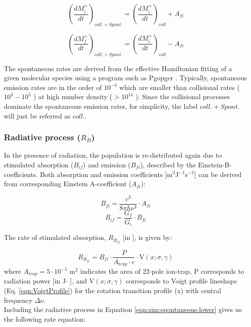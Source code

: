 \begin{equation}
    \left( \frac{dM^+_i}{dt} \right) _{coll. + Spont.} = \left( \frac{dM^+_i}{dt} \right) _{coll} + A_{fi}
    \label{eqn:sim:spontaneous-lower}
\end{equation}

\begin{equation}
    \left( \frac{dM^+_f}{dt} \right) _{coll. + Spont.} = \left( \frac{dM^+_i}{dt} \right) _{coll} - A_{fi}
    \label{eqn:sim:spontaneous-upper}
\end{equation}

The spontaneous rates are derived from the effective Hamiltonian fitting of a given molecular species using a program such as Pgopger \cite{western_pgopher_2017}. Typically, spontaneous emission rates are in the order of  $10^{-4}$ \pers which are smaller than collisional rates ($10^{3}-10^{5}$ \pers) at high number density ($>10^{14}$ \percc). Since the collisional processes dominate the spontaneous emission rates, for simplicity, the label $coll. + Spont.$ will just be referred as $coll.$.\\

\subsubsection{Radiative process (\texorpdfstring{$R_B$}{R_B})}
\label{subsec:ROSAA-simulation-rad}

In the presence of radiation, the population is re-distributed again due to stimulated absorption ($B_{if}$) and emission ($B_{fi}$), described by the Einstein-B-coefficients. Both absorption and emission coefficients [m$^3$J$^{-1}$s$^{-2}$] can be derived from corresponding Einstein A-coefficient ($A_{fi}$):

\[ B_{fi} = \frac{c^3}{8\pi h \nu ^3} \cdot A_{fi} \]
\[ B_{if} = \frac{G_f}{G_i} \cdot B_{fi} \]

The rate of stimulated absorption, $R_{B_{if}}$ [in \pers], is given by:

\[ R_{B_{fi}} = B_{fi} \cdot \frac{P}{A_{trap} \cdot c} \cdot \text{V}(x;\sigma, \gamma) \]
where $A_{trap}=5 \cdot 10^{-5}$ m$^2$ indicates the area of 22-pole ion-trap, P corresponds to radiation power [in J$\cdot$ \pers], and $\text{V}(x;\sigma, \gamma)$ corresponds to Voigt profile lineshape (Eq. \ref{eqn:VoigtProfile}) for the rotation transition profile (x) with central frequency $\Delta \nu$.\\

Including the radiative process in Equation \ref{eqn:sim:spontaneous-lower} gives us the following rate equation:

